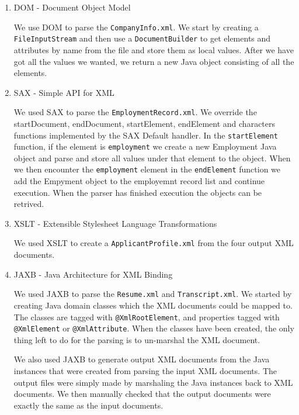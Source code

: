 \documentclass[a4paper, 11pt]{article}
\begin{document}
\begin{enumerate}
    \item DOM - Document Object Model
   
    We use DOM to parse the \texttt{CompanyInfo.xml}. We start by creating a \texttt{FileInputStream} and then use a \texttt{DocumentBuilder} to get elements and attributes by name from the file and store them as local values. After we have got all the values we wanted, we return a new Java object consisting of all the elements.
    
    \item SAX - Simple API for XML
    
    We used SAX to parse the \texttt{EmploymentRecord.xml}. We override the startDocument, endDocument, startElement, endElement and characters functions implemented by the SAX Default handler. In the \texttt{startElement} function, if the element is \texttt{employment} we create a new Employment Java object and parse and store all values under that element to the object. When we then encounter the \texttt{employment} element in the \texttt{endElement} function we add the Empyment object to the employemnt record list and continue execution. When the parser has finished execution the objects can be retrived.
    
    \item XSLT - Extensible Stylesheet Language Transformations
    
    We used XSLT to create a \texttt{ApplicantProfile.xml} from the four output XML documents.
    
    \item JAXB - Java Architecture for XML Binding
    
    We used JAXB to parse the \texttt{Resume.xml} and \texttt{Transcript.xml}. We started by creating Java domain classes which the XML documents could be mapped to. The classes are tagged with \texttt{@XmlRootElement}, and properties tagged with \texttt{@XmlElement} or \texttt{@XmlAttribute}. When the classes have been created, the only thing left to do for the parsing is to un-marshal the XML document.
    
    We also used JAXB to generate output XML documents from the Java instances that were created from parsing the input XML documents. The output files were simply made by marshaling the Java instances back to XML documents. We then manually checked that the output documents were exactly the same as the input documents.
    
\end{enumerate}
\end{document}
